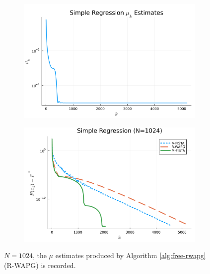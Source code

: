 \documentclass[12pt]{article}
\begin{document}
            \begin{figure}[H]
                \centering
                \begin{subfigure}[b]{0.47\textwidth}
                    \centering
                    \includegraphics[width=\textwidth]{assets/simple_regression_loss_sc_estimates_1024.png}
                \end{subfigure}
                \hfill
                \begin{subfigure}[b]{0.47\textwidth}
                    \centering
                    \includegraphics[width=\textwidth]{assets/simple_regression_loss_1024.png}
                \end{subfigure}
                \caption{
                    $N = 1024$, the $\mu$ estimates produced by Algorithm \ref{alg:free-rwapg} (R-WAPG) is recorded.
                }
                \label{fig:simple-quadratic-r-wapg-mu-estimates}
            \end{figure}
\end{document}
